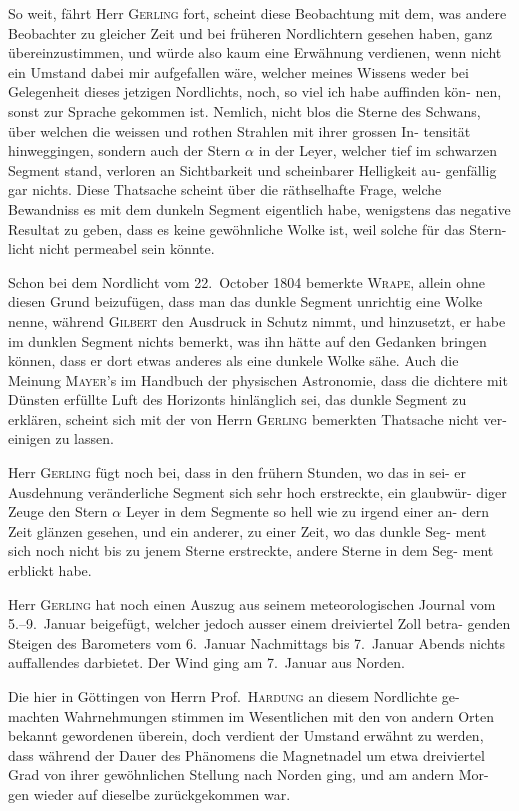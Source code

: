 \documentclass[12pt,a4paper]{article}
\begin{document}
So weit, fährt Herr \textsc{Gerling} fort, scheint diese Beobachtung mit dem, was 
andere Beobachter zu gleicher Zeit und bei früheren Nordlichtern gesehen haben, 
ganz übereinzustimmen, und würde also kaum eine Erwähnung verdienen, wenn 
nicht ein Umstand dabei mir aufgefallen wäre, welcher meines Wissens weder 
bei Gelegenheit dieses jetzigen Nordlichts, noch, so viel ich habe auffinden kön-
nen, sonst zur Sprache gekommen ist. Nemlich, nicht blos die Sterne des 
Schwans, über welchen die weissen und rothen Strahlen mit ihrer grossen In-
tensität hinweggingen, sondern auch der Stern $\alpha$ in der Leyer, welcher tief im 
schwarzen Segment stand, verloren an Sichtbarkeit und scheinbarer Helligkeit au-
genfällig gar nichts. Diese Thatsache scheint über die räthselhafte Frage, welche 
Bewandniss es mit dem dunkeln Segment eigentlich habe, wenigstens das negative 
Resultat zu geben, dass es keine gewöhnliche Wolke ist, weil solche für das Stern-
licht nicht permeabel sein könnte.

Schon bei dem Nordlicht vom 22.\ October 1804 bemerkte \textsc{Wrape}, allein 
ohne diesen Grund beizufügen, dass man das dunkle Segment unrichtig eine 
Wolke nenne, während \textsc{Gilbert} den Ausdruck in Schutz nimmt, und hinzusetzt, 
er habe im dunklen Segment nichts bemerkt, was ihn hätte auf den Gedanken 
bringen können, dass er dort etwas anderes als eine dunkele Wolke sähe. Auch 
die Meinung \textsc{Mayer}'s im Handbuch der physischen Astronomie, dass die dichtere 
mit Dünsten erfüllte Luft des Horizonts hinlänglich sei, das dunkle Segment zu 
erklären, scheint sich mit der von Herrn \textsc{Gerling} bemerkten Thatsache nicht ver-
einigen zu lassen.

Herr \textsc{Gerling} fügt noch bei, dass in den frühern Stunden, wo das in sei-
er Ausdehnung veränderliche Segment sich sehr hoch erstreckte, ein glaubwür-
diger Zeuge den Stern $\alpha$ Leyer in dem Segmente so hell wie zu irgend einer an-
dern Zeit glänzen gesehen, und ein anderer, zu einer Zeit, wo das dunkle Seg-
ment sich noch nicht bis zu jenem Sterne erstreckte, andere Sterne in dem Seg-
ment erblickt habe.

Herr \textsc{Gerling} hat noch einen Auszug aus seinem meteorologischen Journal 
vom 5.--9.\ Januar beigefügt, welcher jedoch ausser einem dreiviertel Zoll betra-
genden Steigen des Barometers vom 6.\ Januar Nachmittags bis 7.\ Januar Abends 
nichts auffallendes darbietet. Der Wind ging am 7.\ Januar aus Norden.

Die hier in Göttingen von Herrn Prof.\ \textsc{Hardung} an diesem Nordlichte ge-
machten Wahrnehmungen stimmen im Wesentlichen mit den von andern Orten 
bekannt gewordenen überein, doch verdient der Umstand erwähnt zu werden, 
dass während der Dauer des Phänomens die Magnetnadel um etwa dreiviertel 
Grad von ihrer gewöhnlichen Stellung nach Norden ging, und am andern Mor-
gen wieder auf dieselbe zurückgekommen war.
\end{document}
